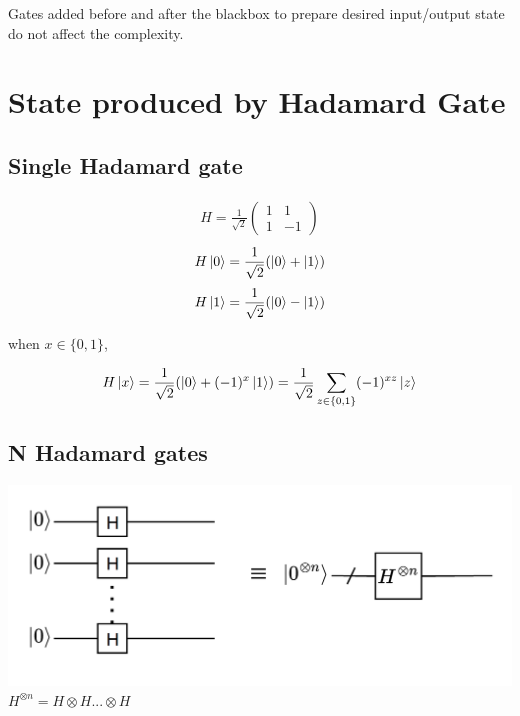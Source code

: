\documentclass{article}
\begin{document}
Gates added before and after the blackbox to prepare desired input/output state do not affect the complexity. 

\section{State produced by Hadamard Gate}

\subsection{Single Hadamard gate}

\begin{gather*}
    H = \frac{1}{\sqrt{2}} 
    \begin{pmatrix}
    1 & 1\\
    1 & -1
    \end{pmatrix}
\end{gather*}
\begin{gather*}
    H \ket{0} = \frac{1}{\sqrt{2}} (\ket{0}+\ket{1})
\end{gather*}
\begin{gather*}
    H \ket{1} = \frac{1}{\sqrt{2}} (\ket{0}-\ket{1})
\end{gather*}

when $x \in \{0, 1\}$,

\begin{gather*}
    H \ket{x} = \frac{1}{\sqrt{2}} (\ket{0}+ (-1)^{x}\ket{1})
    =  \frac{1}{\sqrt{2}} \sum \limits _{z \in \{0,1\}} (-1)^{xz} \ket{z}
\end{gather*}

\subsection{N Hadamard gates}
\includegraphics[scale=0.5]{q4.png}
$H^{\otimes n} = H \otimes H ... \otimes H$
\end{document}
